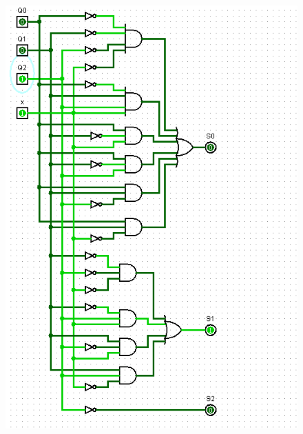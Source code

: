 \documentclass[]{article}
\begin{document}
\begin{minipage}{0.5\textwidth}
\begin{figure}[H]
	\centering
	\includegraphics[width=1\textwidth]{test1_1.png}
\end{figure}
\end{minipage}
\end{document}
